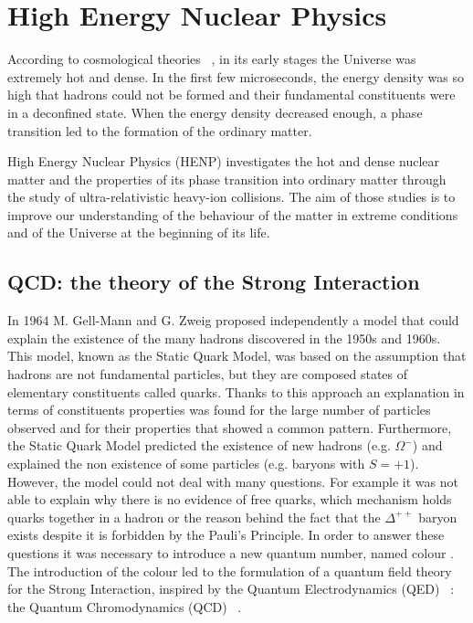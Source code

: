 %
\chapter{High Energy Nuclear Physics}
\label{sec:1}


According to cosmological theories ~\cite{cosm1,cosm2,cosm3,cosm4}, in its early stages the 
Universe was extremely hot and dense. 
In the first few microseconds, the energy density was so high that hadrons could not be formed and
their fundamental constituents were in a deconfined state. When the energy density decreased enough, a phase transition led to the formation of the ordinary matter. 

High Energy Nuclear Physics (HENP) investigates the hot and dense nuclear matter and the properties
of its phase transition into ordinary matter through the study of ultra-relativistic heavy-ion collisions. 
The aim of those studies is to improve our understanding of the behaviour of the matter in extreme
conditions and of the Universe at the beginning of its life.

\section{QCD: the theory of the Strong Interaction}
\label{sec:1.1}

In 1964 M. Gell-Mann \cite{gellmann} and G. Zweig \cite{zweig1, zweig2} proposed independently a model that could explain the existence of
the many hadrons discovered in the 1950s and 1960s. 
This model, known as the Static Quark Model, was based on the assumption that hadrons are not
fundamental particles, but they are composed states of elementary constituents called quarks.
Thanks to this approach an explanation in terms of constituents properties was found for the large number 
of particles observed and for their properties that showed a common pattern.
Furthermore, the Static Quark Model predicted the existence of new hadrons (e.g. 
$\Omega^{-}\xspace$) and explained the non existence of some particles (e.g. baryons with $S=+1$).
However, the model could not deal with many questions. For example it was not able to explain why there
is no evidence of free quarks, which mechanism holds quarks together in a hadron or the reason behind the
fact that the $\Delta^{++}$ baryon exists despite it is forbidden by the Pauli's Principle.
In order to answer these questions it was necessary to introduce a new quantum number, named colour
\cite{fritzsch-gellmann}. The introduction of the colour led to the formulation of a
quantum field theory for the Strong Interaction, inspired by the Quantum
Electrodynamics (QED) ~\cite{peskin}: the Quantum Chromodynamics (QCD) ~\cite{peskin}.

